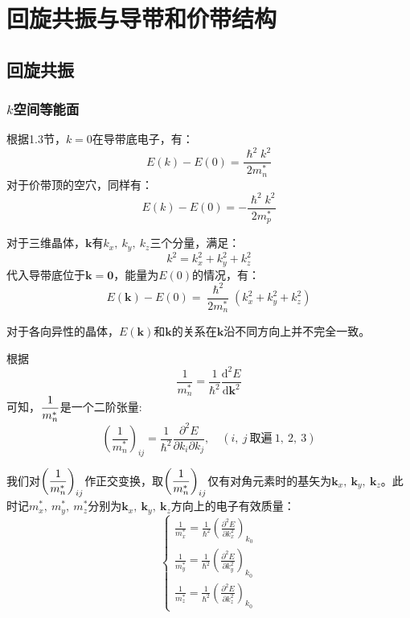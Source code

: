\chapter{回旋共振与导带和价带结构}

\section{回旋共振}

\subsection{\texorpdfstring{$k$}{k}空间等能面}

根据1.3节，$k=0$在导带底电子，有：
\begin{equation}
    E(k)-E(0)=\frac{\hslash^2k^2}{2m_n^*}
\end{equation}
对于价带顶的空穴，同样有：
\begin{equation}
    E(k)-E(0)=-\frac{\hslash^2k^2}{2m_p^*}
\end{equation}

对于三维晶体，$\bm k$有$k_x,\ k_y,\ k_z$三个分量，满足：
\begin{equation}
    k^2=k_x^2+k_y^2+k_z^2
\end{equation}
代入导带底位于$\bm k=\bm 0$，能量为$E(0)$的情况，有：
\begin{equation}
    E(\bm k)-E(0)=\frac{\hslash^2}{2m_n^*}\left(k_x^2+k_y^2+k_z^2\right)
\end{equation}

对于各向异性的晶体，$E(\bm k)$和$\bm k$的关系在$\bm k$沿不同方向上并不完全一致。

根据
\begin{equation}
    \frac{1}{m_n^*}=\frac{1}{\hslash^2}\frac{\mathrm{d}^2E}{\mathrm{d}\bm k^2}
\end{equation}
\vspace{1ex}可知，$\displaystyle\frac{1}{m_n^*}$是一个二阶张量:
\begin{equation}
    \left(\frac{1}{m_n^*}\right)_{ij}=
    \frac{1}{\hslash^2}\frac{\partial^2E}{\partial k_i\partial k_j}
    ,\quad \left(i,\ j\ \text{取遍}\ 1,\ 2,\ 3\right)
\end{equation}

\vspace{1ex}我们对$\displaystyle\left(\frac{1}{m_n^*}\right)_{ij}$作正交变换，取$\displaystyle\left(\frac{1}{m_n^*}\right)_{ij}$仅有对角元素时的基矢为$\bm k_x,\ \bm k_y,\ \bm k_z$。此时记$m_x^*,\ m_y^*,\ m_z^*$分别为$\bm k_x,\ \bm k_y,\ \bm k_z$方向上的电子有效质量：
\begin{equation}
    \left\{
    \begin{aligned}
        \frac{1}{m_x^*}=\frac{1}{\hslash^2}\left(\frac{\partial^2E}{\partial k_x^2}\right)_{k_0}\\
        \frac{1}{m_y^*}=\frac{1}{\hslash^2}\left(\frac{\partial^2E}{\partial k_y^2}\right)_{k_0}\\
        \frac{1}{m_z^*}=\frac{1}{\hslash^2}\left(\frac{\partial^2E}{\partial k_z^2}\right)_{k_0}
        \end{aligned}
    \right.
\end{equation}

